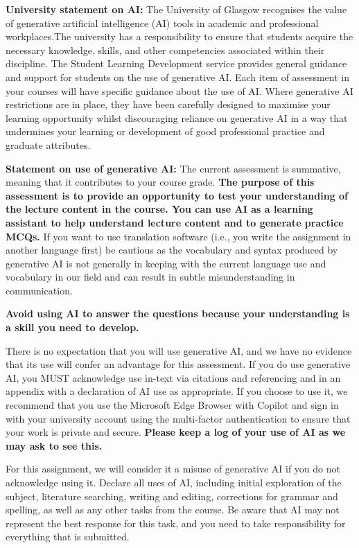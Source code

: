 \documentclass[
  english,
  letterpaper,
  DIV=11,
  numbers=noendperiod]{scrreprt}
\begin{document}
\textbf{University statement on AI:} The University of Glasgow
recognises the value of generative artificial intelligence (AI) tools in
academic and professional workplaces.The university has a responsibility
to ensure that students acquire the necessary knowledge, skills, and
other competencies associated within their discipline. The Student
Learning Development service provides general guidance and support for
students on the use of generative AI. Each item of assessment in your
courses will have specific guidance about the use of AI. Where
generative AI restrictions are in place, they have been carefully
designed to maximise your learning opportunity whilst discouraging
reliance on generative AI in a way that undermines your learning or
development of good professional practice and graduate attributes.

\textbf{Statement on use of generative AI:} The current assessment is
summative, meaning that it contributes to your course grade. \textbf{The
purpose of this assessment is to provide an opportunity to test your
understanding of the lecture content in the course. You can use AI as a
learning assistant to help understand lecture content and to generate
practice MCQs.} If you want to use translation software (i.e., you write
the assignment in another language first) be cautious as the vocabulary
and syntax produced by generative AI is not generally in keeping with
the current language use and vocabulary in our field and can result in
subtle misunderstanding in communication.

\textbf{Avoid using AI to answer the questions because your
understanding is a skill you need to develop.}

There is no expectation that you will use generative AI, and we have no
evidence that its use will confer an advantage for this assessment. If
you do use generative AI, you MUST acknowledge use in-text via citations
and referencing and in an appendix with a declaration of AI use as
appropriate. If you choose to use it, we recommend that you use the
Microsoft Edge Browser with Copilot and sign in with your university
account using the multi-factor authentication to ensure that your work
is private and secure. \textbf{Please keep a log of your use of AI as we
may ask to see this.}

For this assignment, we will consider it a misuse of generative AI if
you do not acknowledge using it. Declare all uses of AI, including
initial exploration of the subject, literature searching, writing and
editing, corrections for grammar and spelling, as well as any other
tasks from the course. Be aware that AI may not represent the best
response for this task, and you need to take responsibility for
everything that is submitted.
\end{document}
